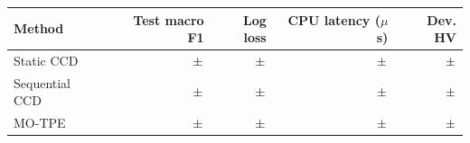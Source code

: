 \begin{tabular}{lrrrr}
\toprule
Method & Test macro F1 & Log loss & CPU latency ($\mu$s) & Dev. HV \\
\midrule
Static CCD & $\m{BAFone} \pm \m{BAFoneSd}$ & $\m{BALogloss} \pm \m{PostLoglossSdA}$ & $\m{BALatency} \pm \m{PostLatencySdA}$ & $\m{BAHv} \pm \m{BAHvSd}$ \\
Sequential CCD & $\m{BBFone} \pm \m{BBFoneSd}$ & $\m{BBLogloss} \pm \m{PostLoglossSdB}$ & $\m{BBLatency} \pm \m{PostLatencySdB}$ & $\m{BBHv} \pm \m{BBHvSd}$ \\
MO-TPE & $\m{BCFone} \pm \m{BCFoneSd}$ & $\m{BCLogloss} \pm \m{PostLoglossSdC}$ & $\m{BCLatency} \pm \m{PostLatencySdC}$ & $\m{BCHv} \pm \m{BCHvSd}$ \\
\bottomrule
\end{tabular}
